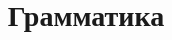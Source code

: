 \documentclass[12pt]{article}
\begin{document}
\author{}
\title{Грамматика}
\maketitle
\tableofcontents
\newpage


\end{document}
